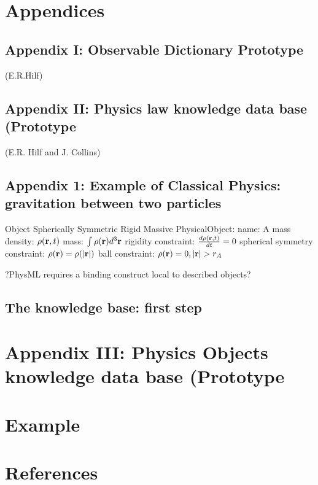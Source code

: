\documentclass[12pt]{article}
\begin{document}
\section{Appendices}
\subsection{Appendix I: Observable Dictionary Prototype}
(E.R.Hilf)
\subsection{Appendix II: Physics law knowledge data base (Prototype}
(E.R. Hilf and J. Collins)
\subsection{Appendix 1: Example of Classical Physics: gravitation between two particles}

Object
Spherically Symmetric Rigid Massive PhysicalObject:
name: A
mass density: $\rho({\bf r}, t)$
mass: $\int \rho({\bf r}) d^3{\bf r}$
rigidity constraint: ${{d \rho({\bf r}, t)}\over{dt}} = 0$
spherical symmetry constraint: $\rho({\bf r}) = \rho(\left|{\bf r}\right|)$
ball constraint:  $\rho({\bf r}) = 0, \left|{\bf r}\right|>r_A$

?PhysML requires a binding construct local to described objects?


\subsection{The knowledge base: first step}
\section{Appendix III: Physics Objects knowledge data base (Prototype}
\section{Example}
\section{References}
\begin{small}
\end{small}
\end{document}

